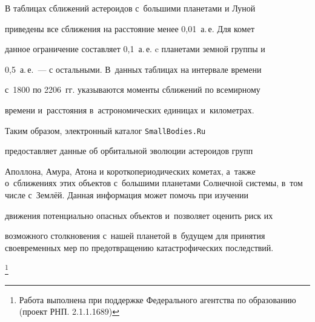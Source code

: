 В таблицах сближений астероидов с~большими планетами и Луной


приведены все сближения на расстояние менее 0,01~а.\,е. Для комет


данное ограничение составляет 0,1~а.\,е. c планетами земной группы и


0,5~а.\,е.~--- с остальными. В~данных таблицах на интервале времени


с~1800 по 2206~гг. указываются моменты сближений по всемирному


времени и~расстояния в~астрономических единицах и~километрах.





Таким образом, электронный каталог {\tt SmallBodies.Ru}


предоставляет данные об орбитальной эволюции астероидов групп


Аполлона, Амура, Атона и короткопериодических кометах, а~также о~сближениях этих объектов с~большими планетами Солнечной системы, в~том числе с~Землёй. Данная информация может помочь при изучении


движения потенциально опасных объектов и~позволяет оценить риск их


возможного столкновения с~нашей планетой в~будущем для принятия своевременных мер по предотвращению катастрофических последствий.








\thanks{Работа выполнена при поддержке Федерального агентства по образованию {\rm(}проект РНП. 2.1.1.1689{\rm)}}






